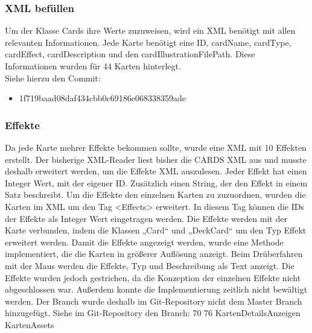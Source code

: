\subsubsection{XML befüllen}
Um der Klasse Cards ihre Werte zuzuweisen, wird ein XML benötigt mit allen relevanten Informationen. Jede Karte benötigt eine ID, cardName, cardType, cardEffect, cardDescription und den cardIllustrationFilePath. Diese Informationen wurden für 44 Karten hinterlegt.\\
Siehe hierzu den Commit:
\begin{itemize}
\item 1f719baad08daf434cbb0c69186e068338359ade
\end{itemize}

\subsubsection{Effekte}
Da jede Karte mehrer Effekte bekommen sollte, wurde eine XML mit 10 Effekten erstellt.
Der bisherige XML-Reader liest bisher die CARDS XML aus und musste deshalb erweitert werden, um die Effekte XML auszulesen. Jeder Effekt hat einen Integer Wert, mit der eigener ID.  Zusätzlich einen String, der den Effekt in einem Satz beschreibt.
Um die Effekte den einzelnen Karten zu zuzuordnen, wurden die Karten im XML um den Tag <Effects> erweitert. In diesem Tag können die IDs der Effekte als Integer Wert eingetragen werden. Die Effekte werden mit der Karte verbunden, indem die Klassen „Card“ und „DeckCard“ um den Typ Effekt erweitert werden. Damit die Effekte angezeigt werden, wurde eine Methode implementiert, die die Karten in größerer Auflösung anzeigt. Beim Drüberfahren mit der Maus werden die Effekte, Typ und Beschreibung als Text anzeigt.
Die Effekte wurden jedoch gestrichen, da die Konzeption der einzelnen Effekte nicht abgeschlossen war. Außerdem konnte die Implementierung zeitlich nicht bewältigt werden. Der Branch wurde deshalb im Git-Repository nicht dem Master Branch hinzugefügt.
Siehe im Git-Repository den Branch: 70 76 KartenDetailsAnzeigen KartenAssets

